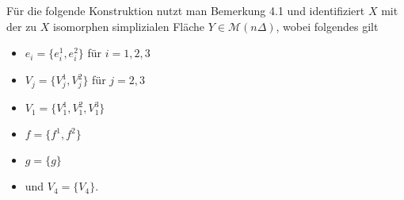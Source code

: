 \documentclass{beamer}
\begin{document}
\begin{frame}
Für die folgende Konstruktion nutzt man Bemerkung 4.1 und identifiziert $X$ mit der zu $X$ isomorphen simplizialen Fläche $Y \in \mathcal{M}(n\Delta) $, wobei folgendes gilt\pause
\begin{itemize}
\item $e_i=\{e_i^1,e_i^2\}$ für $i=1,2,3$\pause
\item $V_j=\{V_j^1,V_j^2\}$ für $j=2,3$\pause
\item $V_1=\{V_1^1,V_1^2,V_1^3\}$\pause
\item $f=\{f^1,f^2\}$\pause
\item $g=\{g\}$\pause
\item und $V_4=\{V_4\}$.
\end{itemize}
\end{frame}
\end{document}
